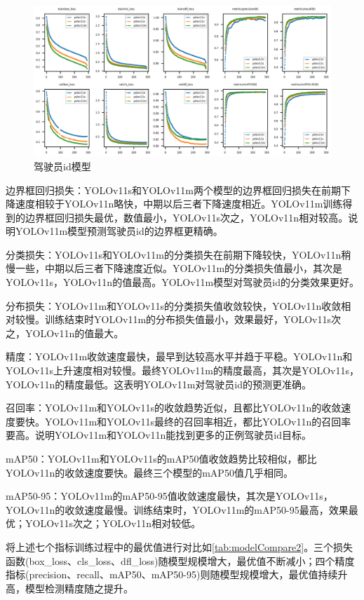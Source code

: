 \begin{figure}[H]
    \centering
    \includegraphics[width=1\textwidth]{figs/chap04/trackResult.png}
    \caption{驾驶员id模型}
    \label{fig:trackResult}
\end{figure}

边界框回归损失：YOLOv11s和YOLOv11m两个模型的边界框回归损失在前期下降速度相较于YOLOv11n略快，中期以后三者下降速度相近。YOLOv11m训练得到的边界框回归损失最优，数值最小，YOLOv11s次之，YOLOv11n相对较高。说明YOLOv11m模型预测驾驶员id的边界框更精确。

分类损失：YOLOv11s和YOLOv11m的分类损失在前期下降较快，YOLOv11n稍慢一些，中期以后三者下降速度近似。YOLOv11m的分类损失值最小，其次是YOLOv11s，YOLOv11n的值最高。YOLOv11m模型对驾驶员id的分类效果更好。

分布损失：YOLOv11m和YOLOv11s的分类损失值收敛较快，YOLOv11n收敛相对较慢。训练结束时YOLOv11m的分布损失值最小，效果最好，YOLOv11s次之，YOLOv11n的值最大。

精度：YOLOv11m收敛速度最快，最早到达较高水平并趋于平稳。YOLOv11n和YOLOv11s上升速度相对较慢。最终YOLOv11m的精度最高，其次是YOLOv11s，YOLOv11n的精度最低。这表明YOLOv11m对驾驶员id的预测更准确。

召回率：YOLOv11m和YOLOv11s的收敛趋势近似，且都比YOLOv11n的收敛速度要快。YOLOv11m和YOLOv11s最终的召回率相近，都比YOLOv11n的召回率要高。说明YOLOv11m和YOLOv11n能找到更多的正例驾驶员id目标。

mAP50：YOLOv11m和YOLOv11s的mAP50值收敛趋势比较相似，都比YOLOv11n的收敛速度要快。最终三个模型的mAP50值几乎相同。

mAP50-95：YOLOv11m的mAP50-95值收敛速度最快，其次是YOLOv11s，YOLOv11n的收敛速度最慢。训练结束时，YOLOv11m的mAP50-95最高，效果最优；YOLOv11s次之；YOLOv11n相对较低。

将上述七个指标训练过程中的最优值进行对比如\ref{tab:modelCompare2}。三个损失函数(box\_loss、cls\_loss、dfl\_loss)随模型规模增大，最优值不断减小；四个精度指标(precision、recall、mAP50、mAP50-95)则随模型规模增大，最优值持续升高，模型检测精度随之提升。

